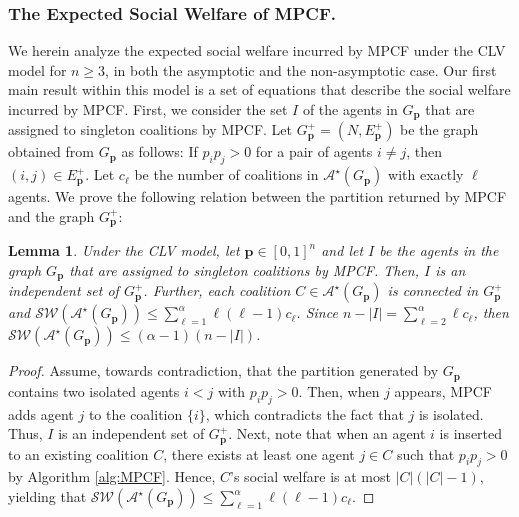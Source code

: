 \documentclass[letterpaper]{article}
\newtheorem{lemma}{Lemma}
\begin{document}
\subsubsection{The Expected Social Welfare of MPCF.}
\label{sec:behaviour of MPCF}

We herein analyze the expected social welfare incurred by MPCF under the CLV model for $n \geq 3$, in both the asymptotic and the non-asymptotic case. %
Our first main result within this model is a set of equations that describe the social welfare incurred by MPCF. First, we consider the set $I$ of the agents in $G_{\mathbf{p}}$ that are assigned to singleton coalitions by MPCF. Let $G^+_{\mathbf{p}} = (N, E_{\mathbf{p}}^+)$ be the graph obtained from $G_{\mathbf{p}}$ as follows: If $p_i p_j > 0$ for a pair of agents $i\neq j$, then $(i,j) \in E_{\mathbf{p}}^+$. Let $c_\ell$ be the number of coalitions in $\mathcal{A}^\star(G_\mathbf{p})$ with exactly $\ell$ agents. We prove the following relation between the partition returned by MPCF and the graph $G^+_{\mathbf{p}}$:
\begin{lemma}
\label{lemma:isolated}
Under the CLV model, let $\mathbf{p} \in [0,1]^n$ and let $I$ be the agents in the graph $G_{\mathbf{p}}$ that are assigned to singleton coalitions by MPCF. Then, $I$ is an independent set of $G^+_{\mathbf{p}}$. Further, each coalition $C \in \mathcal{A}^\star(G_\mathbf{p})$ is connected in $G^+_{\mathbf{p}}$ and $\mathcal{SW}(\mathcal{A}^\star(G_\mathbf{p})) \leq \sum_{\ell=1}^\alpha \ell(\ell-1) c_\ell$. Since $n - |I| = \sum_{\ell=2}^\alpha \ell c_\ell$, then $\mathcal{SW}(\mathcal{A}^\star(G_\mathbf{p})) \leq (\alpha-1) (n-|I|)$.
\end{lemma}
\begin{proof}
Assume, towards contradiction, that the partition generated by $G_{\mathbf{p}}$ contains two isolated agents $i<j$ with $p_i p_j > 0$. Then, when $j$ appears, MPCF adds agent $j$ to the coalition $\{i\}$, which contradicts the fact that $j$ is isolated. Thus, $I$ is an independent set of $G^+_{\mathbf{p}}$. Next, note that when an agent $i$ is inserted to an existing coalition $C$, there exists at least one agent $j \in C$ such that $p_i p_j > 0$ by Algorithm \ref{alg:MPCF}. Hence, $C$'s social welfare is at most $|C|(|C|-1)$, yielding that $\mathcal{SW}(\mathcal{A}^\star(G_\mathbf{p})) \leq \sum_{\ell=1}^\alpha \ell(\ell-1) c_\ell$.
\end{proof}
\end{document}
